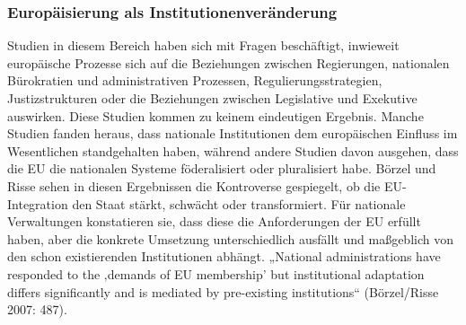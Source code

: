 \subsubsection{Europäisierung als Institutionenveränderung }
Studien in diesem Bereich haben sich mit Fragen beschäftigt, inwieweit europäische Prozesse sich auf die Beziehungen zwischen Regierungen, nationalen Bürokratien und administrativen Prozessen, Regulierungsstrategien, Justizstrukturen oder die Beziehungen zwischen Legislative und Exekutive auswirken. Diese Studien kommen zu keinem eindeutigen Ergebnis. Manche Studien fanden heraus, dass nationale Institutionen dem europäischen Einfluss im Wesentlichen standgehalten haben, während andere Studien davon ausgehen, dass die EU die nationalen Systeme föderalisiert oder pluralisiert habe. Börzel und Risse sehen in diesen Ergebnissen die Kontroverse gespiegelt, ob die EU-Integration den Staat stärkt, schwächt oder transformiert. Für nationale Verwaltungen konstatieren sie, dass diese die Anforderungen der EU erfüllt haben, aber die konkrete Umsetzung unterschiedlich ausfällt und maßgeblich von den schon existierenden Institutionen abhängt. „National administrations have responded to the ‚demands of EU membership’ but institutional adaptation differs significantly and is mediated by pre-existing institutions“ (Börzel/Risse 2007: 487).

